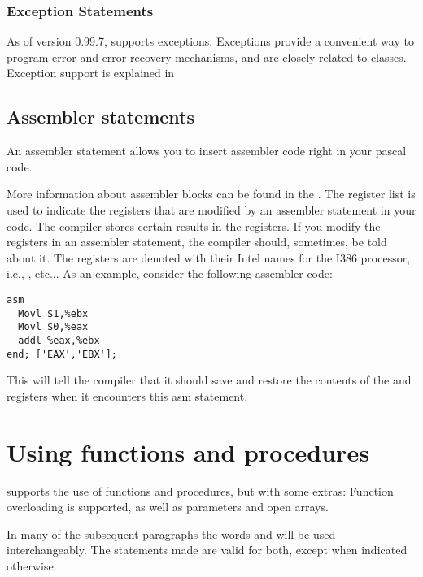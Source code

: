 \documentclass{report}
\begin{document}
\subsection{Exception Statements}
As of version 0.99.7, \fpc supports exceptions. Exceptions provide a
convenient way to program error and error-recovery mechanisms, and are
closely related to classes.
Exception support is explained in 

\section{Assembler statements}
An assembler statement allows you to insert assembler code right in your
pascal code.

More information about assembler blocks can be found in the \progref.
The register list is used to indicate the registers that are modified by an
assembler statement in your code. The compiler stores certain results in the
registers. If you modify the registers in an assembler statement, the compiler
should, sometimes, be told about it. The registers are denoted with their
Intel names for the I386 processor, i.e., ,  etc...
As an example, consider the following assembler code:
\begin{verbatim}
asm
  Movl $1,%ebx
  Movl $0,%eax
  addl %eax,%ebx
end; ['EAX','EBX'];
\end{verbatim}
This will tell the compiler that it should save and restore the contents of
the  and  registers when it encounters this asm statement.
\chapter{Using functions and procedures}
\label{ch:Procedures}
\fpc supports the use of functions and procedures, but with some extras:
Function overloading is supported, as well as  parameters and
open arrays.

\begin{remark} In many of the subsequent paragraphs the words 
and  will be used interchangeably. The statements made are
valid for both, except when indicated otherwise.
\end{remark}

\end{document}

